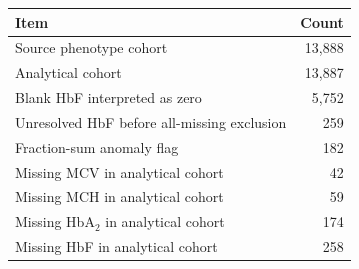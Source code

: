 \begin{tabular}{lr}
\toprule
Item & Count \\
\midrule
Source phenotype cohort & 13,888 \\
Analytical cohort & 13,887 \\
Blank HbF interpreted as zero & 5,752 \\
Unresolved HbF before all-missing exclusion & 259 \\
Fraction-sum anomaly flag & 182 \\
Missing MCV in analytical cohort & 42 \\
Missing MCH in analytical cohort & 59 \\
Missing HbA$_2$ in analytical cohort & 174 \\
Missing HbF in analytical cohort & 258 \\
\bottomrule
\end{tabular}
